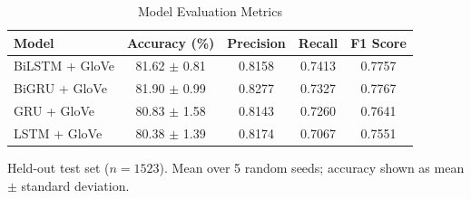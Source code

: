 \begin{table}[!t]
\centering
\caption{Model Evaluation Metrics}
\label{tab:metrics}
\footnotesize
\begin{tabular}{lcccc}
\toprule
\textbf{Model} & \textbf{Accuracy (\%)} & \textbf{Precision} & \textbf{Recall} & \textbf{F1 Score} \\
\midrule
BiLSTM + GloVe & 81.62 $\pm$ 0.81 & 0.8158 & 0.7413 & 0.7757 \\
BiGRU + GloVe & 81.90 $\pm$ 0.99 & 0.8277 & 0.7327 & 0.7767 \\
GRU + GloVe & 80.83 $\pm$ 1.58 & 0.8143 & 0.7260 & 0.7641 \\
LSTM + GloVe & 80.38 $\pm$ 1.39 & 0.8174 & 0.7067 & 0.7551 \\
\bottomrule
\end{tabular}

\vspace{2pt}
\parbox{0.95\columnwidth}{\scriptsize Held-out test set ($n=1523$). Mean over 5 random seeds; accuracy shown as mean $\pm$ standard deviation.}
\end{table}

